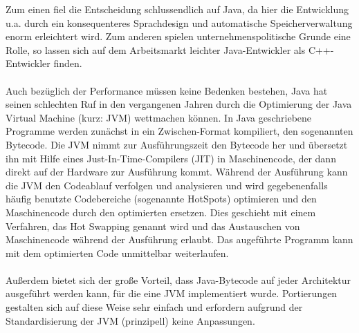 \noindent
Zum einen fiel die Entscheidung schluss\-end\-lich auf \textsf{Java}, da hier die Entwicklung u.a. durch ein konsequenteres Sprachdesign und automatische Speicherverwaltung enorm erleichtert wird. Zum anderen spielen unternehmenspolitische Grunde eine Rolle, so lassen sich auf dem Arbeitsmarkt leichter \textsf{Java}-Entwickler als \textsf{C++}-Entwickler finden. \\
\\
Auch bezüglich der Performance müssen keine Bedenken bestehen, \textsf{Java} hat seinen schlechten Ruf in den vergangenen Jahren durch die Optimierung der \textsf{Java Virtual Machine} (kurz: \textsf{JVM}) wettmachen können. In \textsf{Java} geschriebene Programme werden zunächst in ein Zwischen-Format kompiliert, den sogenannten Bytecode. Die \textsf{JVM} nimmt zur Ausführungszeit den Bytecode her und übersetzt ihn mit Hilfe eines \textsf{Just-In-Time}-Compilers (\textsf{JIT}) in Maschinencode, der dann direkt auf der Hardware zur Ausführung kommt. Während der Ausführung kann die \textsf{JVM} den Codeablauf verfolgen und analysieren und wird gegebenenfalls häufig benutzte Codebereiche (sogenannte \textsf{Hot\-Spots}) optimieren und den Maschinencode durch den optimierten ersetzen. Dies geschieht mit einem Verfahren, das \textsf{Hot Swapping} genannt wird und das Austauschen von Maschinencode während der Ausführung erlaubt. Das augeführte Programm kann mit dem optimierten Code unmittelbar weiterlaufen. \\
\\
Außerdem bietet sich der große Vorteil, dass \textsf{Java}-Bytecode auf jeder Architektur ausgeführt werden kann, für die eine \textsf{JVM} implementiert wurde. Portierungen gestalten sich auf diese Weise sehr einfach und erfordern aufgrund der Standardisierung der \textsf{JVM} (prinzipell) keine Anpassungen.
